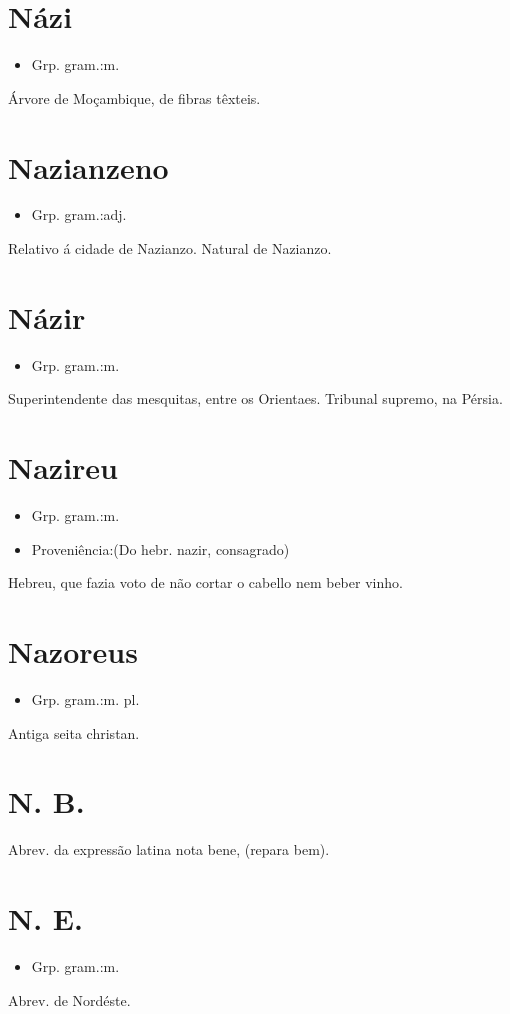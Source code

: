 \section{Názi}
\begin{itemize}
\item {Grp. gram.:m.}
\end{itemize}
Árvore de Moçambique, de fibras têxteis.
\section{Nazianzeno}
\begin{itemize}
\item {Grp. gram.:adj.}
\end{itemize}
Relativo á cidade de Nazianzo.
Natural de Nazianzo.
\section{Názir}
\begin{itemize}
\item {Grp. gram.:m.}
\end{itemize}
Superintendente das mesquitas, entre os Orientaes.
Tribunal supremo, na Pérsia.
\section{Nazireu}
\begin{itemize}
\item {Grp. gram.:m.}
\end{itemize}
\begin{itemize}
\item {Proveniência:(Do hebr. \textunderscore nazir\textunderscore , consagrado)}
\end{itemize}
Hebreu, que fazia voto de não cortar o cabello nem beber vinho.
\section{Nazoreus}
\begin{itemize}
\item {Grp. gram.:m. pl.}
\end{itemize}
Antiga seita christan.
\section{N. B.}
Abrev. da expressão latina \textunderscore nota bene\textunderscore , (repara bem).
\section{N. E.}
\begin{itemize}
\item {Grp. gram.:m.}
\end{itemize}
Abrev. de \textunderscore Nordéste\textunderscore .
